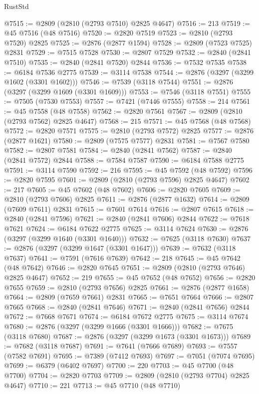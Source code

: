 \begin{lexlean}{RustStd}
\begin{coremodule}
@7515 := @2809 (@2810 (@2793 @7510) @2825 @4647)
@7516 := 213
@7519 := @45 @7516 (@48 @7516)
@7520 := @2820 @7519
@7523 := @2810 (@2793 @7520) @2825
@7525 := @2876 (@2877 @1594)
@7528 := @2809 (@7523 @7525) @2831
@7529 := @7515 @7528
@7530 := @2807 @7529
@7532 := @2840 (@2841 @7510)
@7535 := @2840 (@2841 @7520) @2844
@7536 := @7532 @7535
@7538 := @6184 @7536 @2775
@7539 := @3114 @7538
@7544 := @2876 (@3297 (@3299 @1602 (@3301 @1602)))
@7546 := @7539 (@3118 @7544)
@7551 := @2876 (@3297 (@3299 @1609 (@3301 @1609)))
@7553 := @7546 (@3118 @7551)
@7555 := @7505 (@7530 @7553)
@7557 := @7421 (@7446 @7555)
@7558 := 214
@7561 := @45 @7558 (@48 @7558)
@7562 := @2820 @7561
@7567 := @2809 (@2810 (@2793 @7562) @2825 @4647)
@7568 := 215
@7571 := @45 @7568 (@48 @7568)
@7572 := @2820 @7571
@7575 := @2810 (@2793 @7572) @2825
@7577 := @2876 (@2877 @1621)
@7580 := @2809 (@7575 @7577) @2831
@7581 := @7567 @7580
@7582 := @2807 @7581
@7584 := @2840 (@2841 @7562)
@7587 := @2840 (@2841 @7572) @2844
@7588 := @7584 @7587
@7590 := @6184 @7588 @2775
@7591 := @3114 @7590
@7592 := 216
@7595 := @45 @7592 (@48 @7592)
@7596 := @2820 @7595
@7601 := @2809 (@2810 (@2793 @7596) @2825 @4647)
@7602 := 217
@7605 := @45 @7602 (@48 @7602)
@7606 := @2820 @7605
@7609 := @2810 (@2793 @7606) @2825
@7611 := @2876 (@2877 @1632)
@7614 := @2809 (@7609 @7611) @2831
@7615 := @7601 @7614
@7616 := @2807 @7615
@7618 := @2840 (@2841 @7596)
@7621 := @2840 (@2841 @7606) @2844
@7622 := @7618 @7621
@7624 := @6184 @7622 @2775
@7625 := @3114 @7624
@7630 := @2876 (@3297 (@3299 @1640 (@3301 @1640)))
@7632 := @7625 (@3118 @7630)
@7637 := @2876 (@3297 (@3299 @1647 (@3301 @1647)))
@7639 := @7632 (@3118 @7637)
@7641 := @7591 (@7616 @7639)
@7642 := 218
@7645 := @45 @7642 (@48 @7642)
@7646 := @2820 @7645
@7651 := @2809 (@2810 (@2793 @7646) @2825 @4647)
@7652 := 219
@7655 := @45 @7652 (@48 @7652)
@7656 := @2820 @7655
@7659 := @2810 (@2793 @7656) @2825
@7661 := @2876 (@2877 @1658)
@7664 := @2809 (@7659 @7661) @2831
@7665 := @7651 @7664
@7666 := @2807 @7665
@7668 := @2840 (@2841 @7646)
@7671 := @2840 (@2841 @7656) @2844
@7672 := @7668 @7671
@7674 := @6184 @7672 @2775
@7675 := @3114 @7674
@7680 := @2876 (@3297 (@3299 @1666 (@3301 @1666)))
@7682 := @7675 (@3118 @7680)
@7687 := @2876 (@3297 (@3299 @1673 (@3301 @1673)))
@7689 := @7682 (@3118 @7687)
@7691 := @7641 (@7666 @7689)
@7693 := @7557 (@7582 @7691)
@7695 := @7389 (@7412 @7693)
@7697 := @7051 (@7074 @7695)
@7699 := @6379 (@6402 @7697)
@7700 := 220
@7703 := @45 @7700 (@48 @7700)
@7704 := @2820 @7703
@7709 := @2809 (@2810 (@2793 @7704) @2825 @4647)
@7710 := 221
@7713 := @45 @7710 (@48 @7710)

\end{coremodule}
\end{lexlean}
